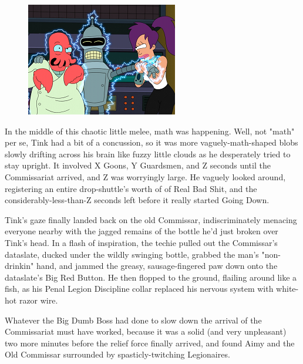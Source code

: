 \begin{figure}
	\begin{center}
		\includegraphics[width=\figwidth]{pics/21/54.png}
	\end{center}
\end{figure}
In the middle of this chaotic little melee, math was happening. 
Well, not "math" per se, Tink had a bit of a concussion, so it was more vaguely-math-shaped blobs slowly drifting across his brain like fuzzy little clouds as he desperately tried to stay upright. 
It involved X Goons, Y Guardsmen, and Z seconds until the Commissariat arrived, and Z was worryingly large. 
He vaguely looked around, registering an entire drop-shuttle's worth of of Real Bad Shit, and the considerably-less-than-Z seconds left before it really started Going Down. 


Tink's gaze finally landed back on the old Commissar, indiscriminately menacing everyone nearby with the jagged remains of the bottle he'd just broken over Tink's head. 
In a flash of inspiration, the techie pulled out the Commissar's dataslate, ducked under the wildly swinging bottle, grabbed the man's "non-drinkin" hand, and jammed the greasy, sausage-fingered paw down onto the dataslate's Big Red Button. 
He then flopped to the ground, flailing around like a fish, as his Penal Legion Discipline collar replaced his nervous system with white-hot razor wire.

Whatever the Big Dumb Boss had done to slow down the arrival of the Commissariat must have worked, because it was a solid (and very unpleasant) two more minutes before the relief force finally arrived, and found Aimy and the Old Commissar surrounded by spasticly-twitching Legionaires.


